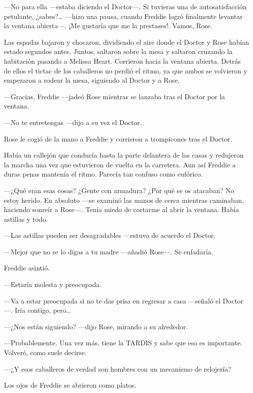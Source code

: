 {---No para ella ---estaba diciendo el Doctor---. Si tuvieras una de
	autosatisfacción petulante, ¿sabes?\ldots{} ---hizo una pausa, cuando
	Freddie logró finalmente levantar la ventana abierta---. ¡Me gustaría
que me la prestases!. Vamos, Rose.}

{Las espadas bajaron y chocaron, dividiendo el aire donde el Doctor y
	Rose habían estado segundos antes. Juntos, saltaron sobre la mesa y
	saltaron cruzando la habitación pasando a Melissa Heart. Corrieron hacia
	la ventana abierta. Detrás de ellos el tictac de los caballeros no
	perdió el ritmo, ya que ambos se volvieron y empezaron a rodear la mesa,
siguiendo al Doctor y a Rose.}

{---Gracias, Freddie ---jadeó Rose mientras se lanzaba tras el Doctor
por la ventana.}

{---No te entretengas ---dijo a su vez el Doctor.}

{Rose le cogió de la mano a Freddie y corrieron a trompicones tras el
Doctor.}

{Había un callejón que conducía hasta la parte delantera de las casas y
	redujeron la marcha una vez que estuvieron de vuelta en la carretera.
	Aun así Freddie a duras penas mantenía el ritmo. Parecía tan confuso
como eufórico.}

{---¿Qué eran esas cosas? ¿Gente con armadura? ¿Por qué se os
	atacaban? No estoy herido. En absoluto ---se examinó las manos de cerca
	mientras caminaban, haciendo sonreír a Rose---. Tenía miedo de cortarme
al abrir la ventana. Había astillas y todo.}

{---Las astillas pueden ser desagradables ---estuvo de acuerdo el
Doctor.}

{---Mejor que no se lo digas a tu madre ---añadió Rose---. Se
enfadaría.}

{Freddie asintió.}

{---Estaría molesta y preocupada.}

{---Va a estar preocupada si no te das prisa en regresar a casa
	---señaló el Doctor---. Iría contigo, pero\ldots{}}

{---¿Nos están siguiendo? ---dijo Rose, mirando a su alrededor.}

{---Probablemente. Una vez más, tiene la TARDIS y sabe que eso es
importante. Volveré, como suele decirse.}

{---¿Y esos caballeros de verdad son hombres con un mecanismo de
relojería?}

{Los ojos de Freddie se abrieron como platos.}

